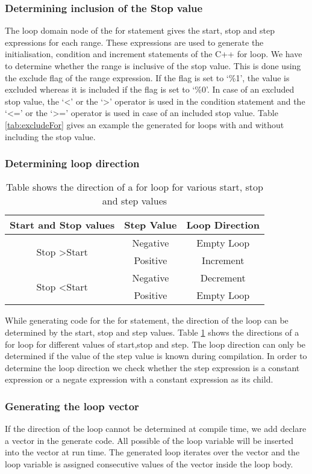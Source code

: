 \subsubsection{Determining inclusion of the Stop value}
The loop domain node of the for statement gives the start, stop and step expressions for each range. These expressions are used to generate the initialisation, condition and increment statements of the C++ for loop. We have to determine whether the range is  inclusive of the stop value.  This is done using the exclude flag of the range expression. If the flag is set to `\%1', the value is excluded whereas it is included if the flag is set to `\%0'. In case of an excluded stop value, the `<' or the `>' operator is used in the condition statement and the `<=' or the `>=' operator is used in case of an included stop value. Table \ref{tab:excludeFor} gives an example the generated for loops with and without including the stop value.
\subsubsection{Determining loop direction}
\begin{table}[htbp]
\centering
\begin{tabular}{|c|c|c|}
\hline
Start and Stop values & Step Value & Loop Direction \\ \hline
\multirow{2}{*}{Stop  \textgreater  Start} & Negative & Empty Loop \\ \cline{2-3} 
 & Positive & Increment \\ \hline
\multirow{2}{*}{Stop \textless Start} & Negative & Decrement \\ \cline{2-3} 
 & Positive & Empty Loop \\ \hline
\end{tabular}
\caption[Loop Direction]{Table shows the direction of a for loop for various start, stop and step values}
\label{tab:loopDirection}
\end{table}
While generating code for the for statement, the direction of the loop can be determined by the start, stop and step values. Table \ref{tab:loopDirection} shows the directions of a for loop for different values of start,stop and step. The loop direction can only be determined if the value of the step value is known during compilation. In order to determine the loop direction we check whether the step expression is  a constant expression or a negate expression with a constant expression as its child.
\subsubsection{ Generating the loop vector}
If the direction of the loop cannot be determined at compile time, we add declare a vector in the generate code. All possible of the loop variable will be inserted into the vector at run time. The generated loop iterates over the vector and the loop variable is assigned consecutive values of the vector inside the loop body. 
